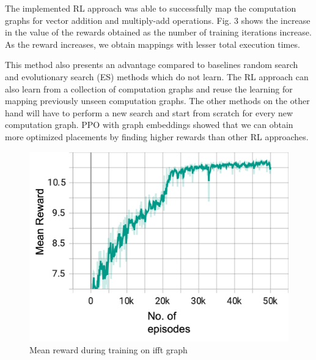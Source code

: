 The implemented RL approach was able to successfully map the computation graphs for vector addition and multiply-add operations. 
Fig. 3 shows the increase in the value of the rewards obtained as the number of training iterations increase. 
As the reward increases, we obtain mappings with lesser total execution times. 

This method also presents an advantage compared to baselines random search and evolutionary search (ES) methods which do not learn. 
The RL approach can also learn from a collection of computation graphs and reuse the learning for mapping previously unseen computation graphs. 
The other methods on the other hand will have to perform a new search and start from scratch for every new computation graph. 
PPO with graph embeddings showed that we can obtain more optimized placements by finding higher rewards than other RL approaches. 

\begin{figure}[h]
    \centering
    \includegraphics[width=\linewidth]{fig/ifft_rewards.png}
    \caption{Mean reward during training on ifft graph}
    \label{fig:ifft_rewards}
  \end{figure}

